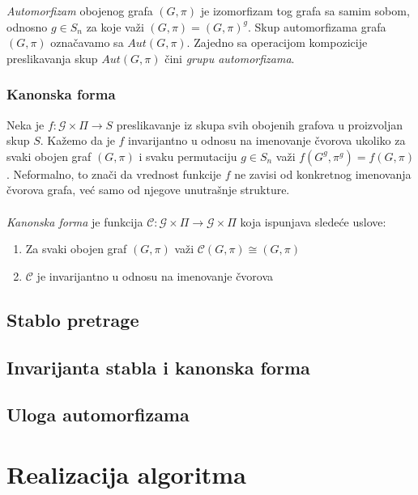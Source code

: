 \documentclass[12pt,oneside]{memoir}
\begin{document}
  \emph{Automorfizam} obojenog grafa $(G, \pi)$ je izomorfizam tog grafa sa
  samim sobom, odnosno $g \in S_n$ za koje važi $(G, \pi) = (G, \pi)^g$. Skup
  automorfizama grafa $(G, \pi)$ označavamo sa $Aut(G, \pi)$. Zajedno sa
  operacijom kompozicije preslikavanja skup $Aut(G, \pi)$ čini \emph{grupu
  automorfizama}.


  \subsection{Kanonska forma}

  Neka je $f : \mathcal{G} \times \Pi \to S$ preslikavanje iz skupa svih
  obojenih grafova u proizvoljan skup $S$.  Kažemo da je $f$ invarijantno u
  odnosu na imenovanje čvorova ukoliko za svaki obojen graf $(G, \pi)$ i svaku
  permutaciju $g \in S_n$ važi $f(G^g, \pi^g) = f(G, \pi)$. Neformalno, to
  znači da vrednost funkcije $f$ ne zavisi od konkretnog imenovanja čvorova
  grafa, već samo od njegove unutrašnje strukture. \\
  \\
  \emph{Kanonska forma} je funkcija $\mathcal{C} : \mathcal{G} \times \Pi \to
  \mathcal{G} \times \Pi$ koja ispunjava sledeće uslove:
  \begin{enumerate}
   \item Za svaki obojen graf $(G, \pi)$ važi $\mathcal{C}(G, \pi) \cong (G,
	   \pi)$
   \item $\mathcal{C}$ je invarijantno u odnosu na imenovanje čvorova
  \end{enumerate}


 \section{Stablo pretrage}

 \section{Invarijanta stabla i kanonska forma}

 \section{Uloga automorfizama}

\chapter{Realizacija algoritma}
\end{document}
